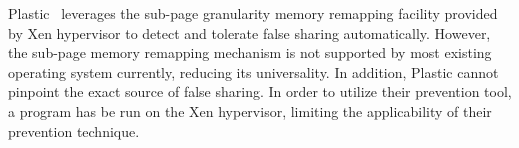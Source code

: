 Plastic~\cite{OSdetection} leverages the sub-page granularity memory remapping facility provided by Xen hypervisor to detect and tolerate false sharing automatically. However, the sub-page memory remapping mechanism is not supported by most existing operating system currently, reducing its universality. In addition, Plastic cannot pinpoint the exact source of false sharing.  
In order to utilize their prevention tool, a program has be run on the Xen hypervisor, limiting the applicability of their prevention technique.
